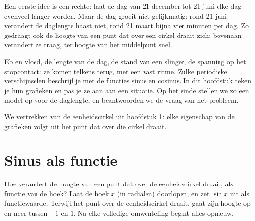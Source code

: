 Een eerste idee is een rechte: laat de dag van 21 december tot 21 juni elke dag evenveel langer worden. Maar de dag groeit niet gelijkmatig: rond 21 juni verandert de daglengte haast niet, rond 21 maart bijna vier minuten per dag. Zo gedraagt ook de hoogte van een punt dat over een cirkel draait zich: bovenaan verandert ze traag, ter hoogte van het middelpunt snel.

Eb en vloed, de lengte van de dag, de stand van een slinger, de spanning op het stopcontact: ze komen telkens terug, met een vast ritme. Zulke periodieke verschijnselen beschrijf je met de functies sinus en cosinus. In dit hoofdstuk teken je hun grafieken en pas je ze aan aan een situatie. Op het einde stellen we zo een model op voor de daglengte, en beantwoorden we de vraag van het probleem.

We vertrekken van de eenheidscirkel uit hoofdstuk 1: elke eigenschap van de grafieken volgt uit het punt dat over die cirkel draait.

\begin{oefeningen}[Start]

\end{oefeningen}

\section{Sinus als functie}

Hoe verandert de hoogte van een punt dat over de eenheidscirkel draait, als functie van de hoek? Laat de hoek $x$ (in radialen) doorlopen, en zet $\sin x$ uit als functiewaarde. Terwijl het punt over de eenheidscirkel draait, gaat zijn hoogte op en neer tussen $-1$ en $1$. Na elke volledige omwenteling begint alles opnieuw.


